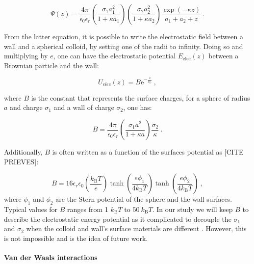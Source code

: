 \begin{equation}
	\Psi(z) = \frac{4\pi}{\epsilon_0 \epsilon_r} 
	\left(
	\frac{\sigma_1 a_1 ^2}{1 + \kappa a_1}
	\right)
	\left(
	\frac{\sigma_2 a_2 ^2}{1 + \kappa a_2}
	\right)
	\frac{\exp(-\kappa z)}{a_1 + a_2 + z} ~.
\end{equation} 

From the latter equation, it is possible to write the electrostatic field between a wall and a spherical colloid, by setting one of the radii to infinity. Doing so and multiplying by $e$, one can have the electrostatic potential $E_\mathrm{elec}(z)$ between a Brownian particle and the wall:

\begin{equation}
	U_{elec} (z) = B \mathrm{e}^{-\frac{z}{\ell_\mathrm{D}}}~,
	\label{Eq:Uelec}
\end{equation}

where $B$ is the constant that represents the surface charges, for a sphere of radius $a$ and charge $\sigma_1$ and a wall of charge $\sigma_2$, one has:

\begin{equation}
	B = \frac{4 \pi}{\epsilon_0 \epsilon_r} \left( \frac{\sigma_1 a^2 }{1 + \kappa a}  \right) \frac{\sigma_2}{\kappa} ~.
\end{equation}

Additionally, $B$ is often written as a function of the surfaces potential as [CITE PRIEVES]:

\begin{equation}
	B = 16 \epsilon_r \epsilon_0 \left(\frac{k_\mathrm{B}T}{e}\right) \tanh \left(\frac{e\phi_1}{4k_\mathrm{B}T}\right) \tanh \left(\frac{e\phi_2}{4k_\mathrm{B}T}\right) ~,
\end{equation}
where $\phi_1$ and $\phi_2$ are the Stern potential of the sphere and the wall surfaces. Typical values for $B$ ranges from 1 $k_\mathrm{B}T$ to $50 ~ k_\mathrm{B}T$. In our study we will keep $B$ to describe the electrostatic energy potential as it complicated to decouple the $\sigma_1$ and $\sigma_2$ when the colloid and wall's surface materials are different \cite{behrens_charge_2001}. However, this is not impossible and is the idea of future work.

\paragraph{Van der Waals interactions}\mbox{}\\
\vspace{0.10cm}


